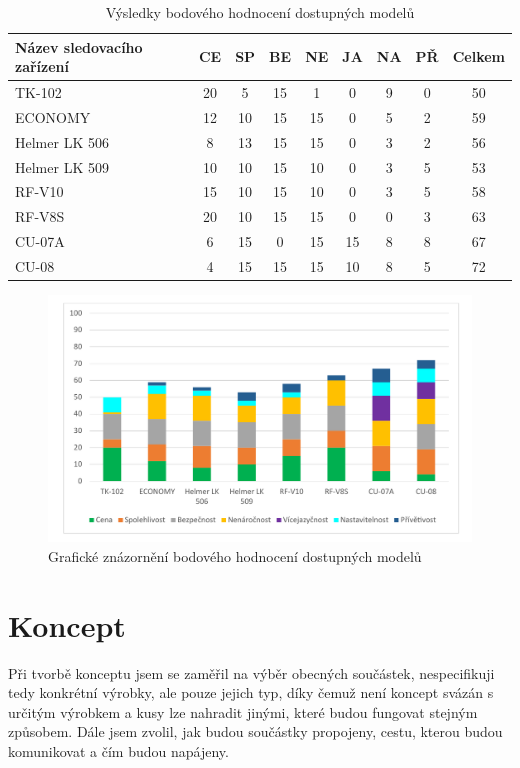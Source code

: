 \documentclass[FM,MP]{tulthesis}  %
\begin{document}
\renewcommand{\arraystretch}{1.5}
\begin{table}[H]
\begin{center}
\begin{tabular}{| l | c | c| c | c | c | c | c | c |}
\hline
Název sledovacího zařízení & CE & SP & BE & NE & JA & NA & PŘ & Celkem\\
\hline
\hline
TK-102 & 20 & 5 & 15 & 1 & 0 & 9 & 0 & 50\\
\hline
ECONOMY & 12 & 10 & 15 & 15 & 0 & 5 & 2 & 59\\
\hline
Helmer LK 506 & 8 & 13 & 15 & 15 & 0 & 3 & 2 & 56\\
\hline
Helmer LK 509 & 10 & 10 & 15 & 10 & 0 & 3 & 5 & 53\\
\hline
RF-V10 & 15 & 10 & 15 & 10 & 0 & 3 & 5 & 58\\
\hline
RF-V8S & 20 & 10 & 15 & 15 & 0 & 0 & 3 & 63\\
\hline
CU-07A & 6 & 15 & 0 & 15 & 15 & 8 & 8 & 67\\
\hline
CU-08 & 4 & 15 & 15 & 15 & 10 & 8 & 5 & 72\\
\hline
\end{tabular}
\end{center}
\caption{Výsledky bodového hodnocení dostupných modelů}
\end{table}

\begin{figure}[H]
\begin{center}
\includegraphics[width=\textwidth]{graphs/graf_bodoveHodnoceni.pdf}
\caption{Grafické znázornění bodového hodnocení dostupných modelů}
\label{image}
\end{center}
\end{figure}


\chapter{Koncept}
Při tvorbě konceptu jsem se zaměřil na výběr obecných součástek, nespecifikuji tedy konkrétní výrobky, ale pouze jejich typ, díky čemuž není koncept svázán s určitým výrobkem a kusy lze nahradit jinými, které budou fungovat stejným způsobem. Dále jsem zvolil, jak budou součástky propojeny, cestu, kterou budou komunikovat a čím budou napájeny.
\end{document}
